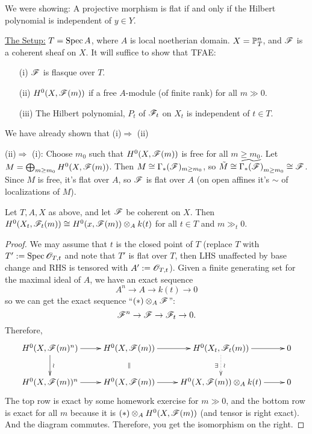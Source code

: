  \setcounter{lecture}{26}

 We were showing: A projective morphism is flat if and only if the
 Hilbert polynomial is independent of $y\in Y$.

 \underline{The Setup:} $T=\spec A$, where $A$ is local noetherian
 domain.  $X=\P^n_T$, and $\F$ is a coherent sheaf on $X$.  It will suffice
  to show that TFAE:
 \begin{itemize}
 \item[(i)] $\F$ is flasque over $T$.
 \item[(ii)] $H^0(X,\F(m))$ if a free $A$-module (of finite rank)
 for all $m\gg 0$.
 \item[(iii)] The Hilbert polynomial, $P_t$ of $\F_t$ on $X_t$ is
 independent of $t\in T$.
 \end{itemize}
 We have already shown that (i)$\Rightarrow$ (ii)

 (ii)$\Rightarrow$ (i): Choose $m_0$ such that $H^0(X,\F(m))$ is
 free for all $m\ge m_0$.  Let $M=\bigoplus_{m\ge m_0}
 H^0(X,\F(m))$.  Then $M\cong \Gamma_*(\F)_{m\ge m_0}$, so $\tilde
 M \cong \widetilde{\Gamma_*(\F)}_{m\ge m_0} \cong \F$.  Since $M$
 is free, it's flat over $A$, so $\F$ is flat over $A$ (on open
 affines it's $\sim$ of localizations of $M$).

 \begin{lemma}
 Let $T,A,X$ as above, and let $\F$ be coherent on $X$.  Then
 $H^0(X_t,\F_t(m)) \cong H^0(x,\F(m))\otimes_A k(t)$ for all $t\in
 T$ and $m\gg_t 0$.
 \end{lemma}
 \begin{proof}
 We may assume that $t$ is the closed point of $T$ (replace $T$ with $T':=\spec
 \O_{T,t}$ and note that $T'$ is flat over $T$, then LHS unaffected by base
 change and RHS is tensored with $A':=\O_{T,t}$).  Given a finite
 generating set for the maximal ideal of $A$, we have an exact
 sequence
 \[
    A^n\to A\to k(t) \to 0 \tag{$\ast$}
 \]
 so we can get the exact sequence ``$(\ast)\otimes_A \F$'':
 \[
    \F^n\to \F\to \F_t \to 0.
 \]
 Therefore,
 \[\xymatrix{
 H^0(X,\F(m)^n) \ar[r] \ar[d]^{\wr} & H^0(X,\F(m)) \ar[r] \ar@{}[d]|{\parallel} & H^0(X_t,\F_t(m))
 \ar[r] \ar@{.>}[d]^{\wr}_{\exists} & 0\\
H^0(X,\F(m))^n \ar[r] & H^0(X,\F(m)) \ar[r] &
H^0(X,\F(m))\otimes_A k(t) \ar[r] &
 0\\
 }\]
 The top row is exact by some homework exercise for $m\gg 0$, and
 the bottom row is exact for all $m$ because it is $(\ast)\otimes_A
 H^0(X,\F(m))$ (and tensor is right exact).  And the diagram
 commutes. Therefore, you get the isomorphism on the right.
 \end{proof}


